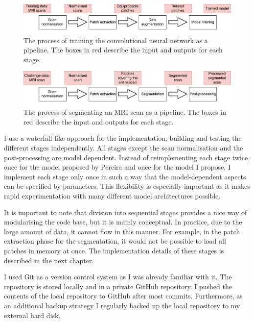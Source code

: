 \documentclass[12pt,a4paper,twoside,openright]{report}
\begin{document}
\begin{figure}
	\centering
	\includegraphics[width=\textwidth]{training_implementation_pipeline}
	\caption[The process of training the convolutional neural network as a pipeline.]{The process of training the convolutional neural network as a pipeline. The boxes in red describe the input and outputs for each stage.}
	\label{fig:training_implementation_pipeline}
\end{figure}

\begin{figure}
	\centering
	\includegraphics[width=\textwidth]{segmentation_implementation_pipeline}
	\caption[The process of segmenting an MRI scan as a pipeline.]{The process of segmenting an MRI scan as a pipeline. The boxes in red describe the input and outputs for each stage.}
	\label{fig:segmentation_implementation_pipeline}
\end{figure}

I use a waterfall like approach for the implementation, building and testing the different stages independently. All stages except the scan normalisation and the post-processing are model dependent. Instead of reimplementing each stage twice, once for the model proposed by Pereira and once for the model I propose, I implement each stage only once in such a way that the model-dependent aspects can be specified by parameters. This flexibility is especially important as it makes rapid experimentation with many different model architectures possible.

It is important to note that division into sequential stages provides a nice way of modularising the code base, but it is mainly conceptual. In practice, due to the large amount of data, it cannot flow in this manner. For example, in the patch extraction phase for the segmentation, it would not be possible to load all patches in memory at once. The implementation details of these stages is described in the next chapter.

I used Git as a version control system as I was already familiar with it. The repository is stored locally and in a private GitHub repository. I pushed the contents of the local repository to GitHub after most commits. Furthermore, as an additional backup strategy I regularly backed up the local repository to my external hard disk.
\end{document}
